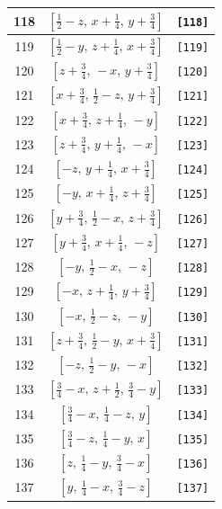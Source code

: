 \documentclass[fleqn,8pt]{jsarticle}
\begin{document}
\begin{longtable}{ccc}
118 & $\left[ \frac{1}{2} - z,\, x + \frac{1}{4},\, y + \frac{3}{4} \right]$ & {\tt [118]} \\ \hline
119 & $\left[ \frac{1}{2} - y,\, z + \frac{1}{4},\, x + \frac{3}{4} \right]$ & {\tt [119]} \\ \hline
120 & $\left[ z + \frac{3}{4},\, - x,\, y + \frac{3}{4} \right]$ & {\tt [120]} \\ \hline
121 & $\left[ x + \frac{3}{4},\, \frac{1}{2} - z,\, y + \frac{3}{4} \right]$ & {\tt [121]} \\ \hline
122 & $\left[ x + \frac{3}{4},\, z + \frac{1}{4},\, - y \right]$ & {\tt [122]} \\ \hline
123 & $\left[ z + \frac{3}{4},\, y + \frac{1}{4},\, - x \right]$ & {\tt [123]} \\ \hline
124 & $\left[ - z,\, y + \frac{1}{4},\, x + \frac{3}{4} \right]$ & {\tt [124]} \\ \hline
125 & $\left[ - y,\, x + \frac{1}{4},\, z + \frac{3}{4} \right]$ & {\tt [125]} \\ \hline
126 & $\left[ y + \frac{3}{4},\, \frac{1}{2} - x,\, z + \frac{3}{4} \right]$ & {\tt [126]} \\ \hline
127 & $\left[ y + \frac{3}{4},\, x + \frac{1}{4},\, - z \right]$ & {\tt [127]} \\ \hline
128 & $\left[ - y,\, \frac{1}{2} - x,\, - z \right]$ & {\tt [128]} \\ \hline
129 & $\left[ - x,\, z + \frac{1}{4},\, y + \frac{3}{4} \right]$ & {\tt [129]} \\ \hline
130 & $\left[ - x,\, \frac{1}{2} - z,\, - y \right]$ & {\tt [130]} \\ \hline
131 & $\left[ z + \frac{3}{4},\, \frac{1}{2} - y,\, x + \frac{3}{4} \right]$ & {\tt [131]} \\ \hline
132 & $\left[ - z,\, \frac{1}{2} - y,\, - x \right]$ & {\tt [132]} \\ \hline
133 & $\left[ \frac{3}{4} - x,\, z + \frac{1}{2},\, \frac{3}{4} - y \right]$ & {\tt [133]} \\ \hline
134 & $\left[ \frac{3}{4} - x,\, \frac{1}{4} - z,\, y \right]$ & {\tt [134]} \\ \hline
135 & $\left[ \frac{3}{4} - z,\, \frac{1}{4} - y,\, x \right]$ & {\tt [135]} \\ \hline
136 & $\left[ z,\, \frac{1}{4} - y,\, \frac{3}{4} - x \right]$ & {\tt [136]} \\ \hline
137 & $\left[ y,\, \frac{1}{4} - x,\, \frac{3}{4} - z \right]$ & {\tt [137]} \\ \hline

\end{longtable}
\end{document}
